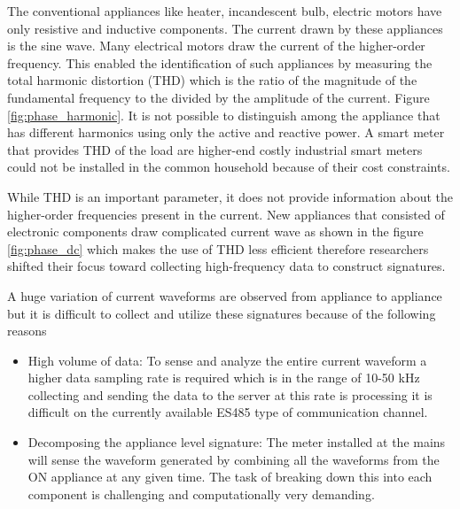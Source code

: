 
The conventional appliances like heater, incandescent bulb, electric motors have only resistive and inductive components. The current drawn by these appliances is the sine wave. Many electrical motors draw the current of the higher-order frequency. This enabled the identification of such appliances by measuring the total harmonic distortion (THD) which is the ratio of the magnitude of the fundamental frequency to the divided by the amplitude of the current. Figure \ref{fig:phase_harmonic}. It is not possible to distinguish among the appliance that has different harmonics using only the active and reactive power. A smart meter that provides THD of the load are higher-end costly industrial smart meters could not be installed in the common household because of their cost constraints. 

While THD is an important parameter, it does not provide information about the higher-order frequencies present in the current. New appliances that consisted of electronic components draw complicated current wave as shown in the figure \ref{fig:phase_dc} which makes the use of THD less efficient therefore researchers shifted their focus toward collecting high-frequency data to construct signatures. 


A huge variation of current waveforms are observed from appliance to appliance but it is difficult to collect and utilize these signatures because of the following reasons  


\begin{itemize}
    \item High volume of data: To sense and analyze the entire current waveform a higher data sampling rate is required which is in the range of 10-50 kHz collecting and sending the data to the server at this rate is processing it is difficult on the currently available ES485 type of communication channel.

\item Decomposing the appliance level signature: The meter installed at the mains will sense the waveform generated by combining all the waveforms from the ON appliance at any given time. The task of breaking down this into each component is challenging and computationally very demanding.

\end{itemize}

